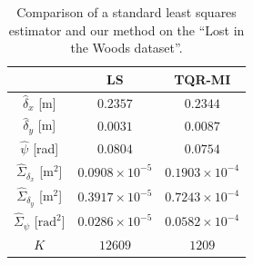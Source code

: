 \begin{table}[!t]
\renewcommand{\arraystretch}{1.3}
\caption{Comparison of a standard least squares estimator and our
  method on the ``Lost in the Woods dataset''.}
\label{tab:dataset2-comp}
\centering
\begin{tabular}{c||c||c}
\hline
& \bfseries LS & \bfseries TQR-MI\\
\hline\hline
$\hat{\delta}_x$ [m] & $0.2357$ & $0.2344$\\
\hline
$\hat{\delta}_y$ [m]& $0.0031$ & $0.0087$\\
\hline
$\hat{\psi}$ [rad] & $0.0804$ & $0.0754$\\
\hline
$\hat{\Sigma}_{\delta_x}$ [$\text{m}^2$] & $0.0908\times 10^{-5}$ &
  $0.1903\times 10^{-4}$\\
\hline
$\hat{\Sigma}_{\delta_y}$ [$\text{m}^2$] & $0.3917\times 10^{-5}$ &
  $0.7243\times 10^{-4}$\\
\hline
$\hat{\Sigma}_{\psi}$ [$\text{rad}^2$] & $0.0286\times 10^{-5}$ &
  $0.0582\times 10^{-4}$\\
\hline
$K$ & $12609$ & $1209$\\
\hline
\end{tabular}
\end{table}
